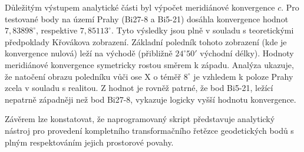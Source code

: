 Důležitým výstupem analytické části byl výpočet meridiánové konvergence $c$. Pro testované body na území Prahy (Bi27-8 a Bi5-21) dosáhla konvergence hodnot $7,83898^\circ$, respektive $7,85113^\circ$. Tyto výsledky jsou plně v souladu s teoretickými předpoklady Křovákova zobrazení. Základní poledník tohoto zobrazení (kde je konvergence nulová) leží na východě (přibližně $24^\circ 50'$ východní délky). Hodnoty meridiánové konvergence symetricky rostou směrem k západu. Analýza ukazuje, že natočení obrazu poledníku vůči ose X o téměř $8^\circ$ je vzhledem k poloze Prahy zcela v souladu s realitou. Z hodnot je rovněž patrné, že bod Bi5-21, ležící nepatrně západněji než bod Bi27-8, vykazuje logicky vyšší hodnotu konvergence.

Závěrem lze konstatovat, že naprogramovaný skript představuje analytický nástroj pro provedení kompletního transformačního řetězce geodetických bodů s plným respektováním jejich prostorové povahy.